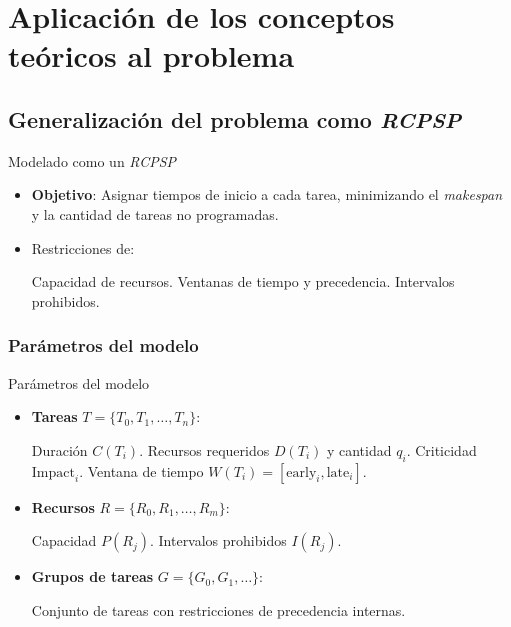 \documentclass[pdfpagelabels=false, usepdftitle=false, aspectratio=169]{beamer}
\begin{document}
\section{Aplicación de los conceptos teóricos al problema}
\subsection{Generalización del problema como \textit{RCPSP}}

\begin{frame}{Modelado como un \textit{RCPSP}}
\begin{itemize}
    \item \textbf{Objetivo}: Asignar tiempos de inicio a cada tarea, minimizando el \textit{makespan} y 
    la cantidad de tareas no programadas.
    \vfill
    \item Restricciones de:
    \begin{itemize}
        \arrowitem Capacidad de recursos.
        \arrowitem Ventanas de tiempo y precedencia.
        \arrowitem Intervalos prohibidos.
    \end{itemize}
\end{itemize}
\vfill
\end{frame}

\subsubsection{Parámetros del modelo}
\begin{frame}{Parámetros del modelo}
\begin{itemize}
    \item \textbf{Tareas} \( T = \{T_0, T_1, \dots, T_n\} \):
    \begin{itemize}
        \arrowitem Duración \( C(T_i) \).
        \arrowitem Recursos requeridos \( D(T_i) \) y cantidad \( q_i \).
        \arrowitem Criticidad \( \text{Impact}_i \).
        \arrowitem Ventana de tiempo \( W(T_i) = [\text{early}_i, \text{late}_i] \).
    \end{itemize}
    \vfill
    \item \textbf{Recursos} \( R = \{R_0, R_1, \dots, R_m\} \):
    \begin{itemize}
        \arrowitem Capacidad \( P(R_j) \).
        \arrowitem Intervalos prohibidos \( I(R_j) \).
    \end{itemize}
    \vfill
    \item \textbf{Grupos de tareas} \( G = \{G_0, G_1, \dots\} \):
    \begin{itemize}
        \arrowitem Conjunto de tareas con restricciones de precedencia internas.
    \end{itemize}
\end{itemize}
\vfill
\end{frame}
\end{document}
